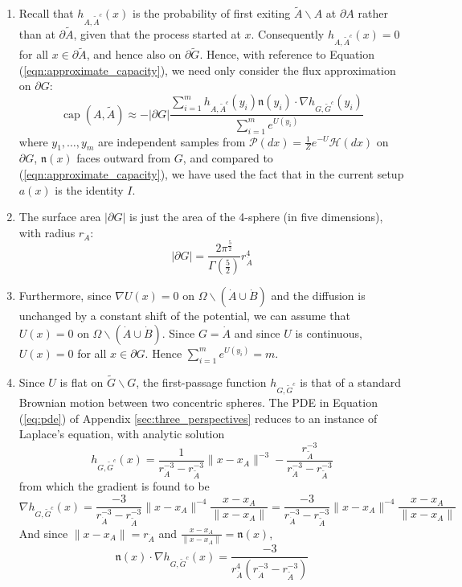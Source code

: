 \documentclass[nofootinbib,english, aip, jcp, priprint, graphicx,floatfix]{revtex4-1}
\theoremstyle{plain}
\theoremstyle{definition}
\theoremstyle{plain}
\newcommand{\normal}{{\mathfrak{n}}}
\newcommand{\capac}[2]{\ensuremath{\operatorname{cap}}(#1,#2)}
\newcommand{\hausdorffmeasure}{\mathscr{H}(dx)}
\newcommand{\PMeasure}{\mathscr{P}(dx)}
\newcommand{\dA}{{\dot A}}
\newcommand{\tA}{{\tilde A}}
\newcommand{\dB}{{\dot B}}
\begin{document}
\begin{enumerate}

\item Recall that $h_{A,\tA^c}(x)$ is the probability of first exiting $\tilde{A}\backslash A$ at $\partial A$ rather than at $\partial\tA$, given that the process started at $x$. 
Consequently $h_{A,\tA^c}(x)=0$ for all $x\in\partial\tA$, and hence also on $\partial\tilde{G}$.
Hence, with reference to Equation (\ref{eqn:approximate_capacity}), we need only consider the flux approximation on $\partial G$:
\begin{equation}
\label{eqn:toy_cap_approx}
\capac{A}{\tilde A} \approx
-|\partial G|
\frac{\sum_{i=1}^m 
h_{A, \tilde{A}^c}(y_i) \normal(y_i)\cdot \nabla h_{G,\tilde{G}^c}(y_i)}
{\sum_{i=1}^m e^{U(y_i)}}
\end{equation}
where $y_1,\ldots,y_m$ are independent samples from 
$\PMeasure=\frac{1}{Z}e^{-U}\hausdorffmeasure$ on $\partial G$, $\normal(x)$ faces outward from $G$, and compared to (\ref{eqn:approximate_capacity}), we have used the fact that in the current setup $a(x)$ is the identity $I$.
 
 \item The surface area $|\partial G|$ is just the area of the 4-sphere (in five dimensions), with radius $r_\dA$:
 \[
 |\partial G| = \frac{2\pi^{\frac{5}{2}}}{\Gamma(\frac{5}{2})}r_\dA^4
 \]
 
 \item 
Furthermore, since 
$\nabla U(x)=0$ on $\Omega\backslash(\dA\cup\dB)$ and the diffusion is unchanged by a constant shift of the potential, we can assume that $U(x)=0$ on $\Omega\backslash(\dA\cup\dB)$. 
Since $G=\dA$ and since $U$ is continuous, $U(x)=0$ for all $x\in \partial G$. Hence $\sum_{i=1}^m e^{U(y_i)}=m$.
 
\item 
\label{lab:analytic}
Since $U$ is flat on $\tilde G \backslash G$, the first-passage function $h_{G,\tilde G^c}$ is that of a standard Brownian motion between two concentric spheres. The PDE in Equation (\ref{eq:pde}) of Appendix \ref{sec:three_perspectives} reduces to an instance of Laplace's equation, with analytic solution\cite{Wendel1980-sj}
 \[ h_{G, \tilde{G}^c} (x) = \frac{1}{r_\dA^{-3} - r_{\tilde{A}}^{ -3}} \| x
- x_A \|^{-3} - \frac{r_{\tilde{A}}^{-3}}{r_\dA^{-3} -
r_{\tilde{A}}^{-3}} \]
from which the gradient is found to be 
\[
\nabla h_{G, \tilde{G}^c} (x)  = \frac{-3}{r_\dA^{-3} - r_{\tilde{A}}^{-3}} \| x - x_A \|^{-4} \frac{x - x_A}{\| x - x_A \|} 
= \frac{-3}{r_\dA^{-3} - r_{\tilde{A}}^{-3}} \| x - x_A \|^{-4} \frac{x - x_A}{\| x - x_A \|} 
\]
And since $\| x - x_A \|=r_\dA$ and  $\frac{x - x_A}{\| x - x_A \|} 
=\normal(x)$,
\[
\normal(x)\cdot\nabla h_{G, \tilde{G}^c} (x)  = 
\frac{-3}
{r_\dA^4(r_\dA^{-3} - r_\tA^{-3})} 
\]


\end{enumerate}
\end{document}
